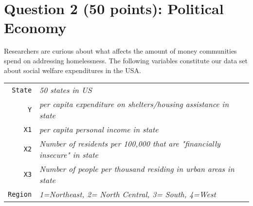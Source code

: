 \documentclass[12pt,letterpaper]{article}
\begin{document}
	\newpage
	
	\section*{Question 2 (50 points): Political Economy}
	
	\noindent Researchers are curious about what affects the amount of money communities spend on addressing homelessness. The following variables constitute our data set about social welfare expenditures in the USA. \\
	\vspace{.5cm}
	
	
	\begin{tabular}{r|l}
		\texttt{State} &\emph{50 states in US} \\
		\texttt{Y} & \emph{per capita expenditure on shelters/housing assistance in state}\\
		\texttt{X1} &\emph{per capita personal income in state} \\
		\texttt{X2} &  \emph{Number of residents per 100,000 that are "financially insecure" in state}\\
		\texttt{X3} &  \emph{Number of people per thousand residing in urban areas in state} \\
		\texttt{Region} &  \emph{1=Northeast, 2= North Central, 3= South, 4=West} \\
	\end{tabular}
	
\end{document}
